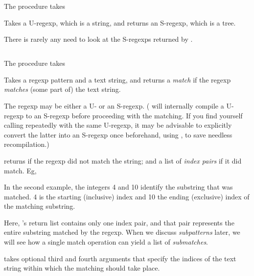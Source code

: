 {\ifx\MzLibManual\Undefined
The procedure  takes 
\else
{}

Takes 
\fi
a U-regexp, which is a string, and returns
an S-regexp, which is a tree.


\n There is rarely any need to look at the S-regexps 
returned by .

\subsection{}

\ifx\MzLibManual\Undefined
The procedure  takes 
\else
{}

Takes
\fi
a
regexp pattern and a text string, and returns a {\em
match} if the regexp {\em matches} (some part of) the text string.

The regexp may be either a U- or an S-regexp.
( will internally compile a
U-regexp to an S-regexp before proceeding with the
matching.  If you find yourself calling
 repeatedly with the same
U-regexp, it may be advisable to explicitly convert the
latter into an S-regexp once beforehand, using
, to save needless recompilation.)

 returns  if the regexp did not
match the string; and a list of {\em index pairs} if it
did match.  Eg,


\n In the second example, the integers 4 and 10 identify
the substring that was matched. 4 is the starting
(inclusive) index and 10 the ending (exclusive) index of
the matching substring.


Here, 's return list contains only 
one index pair, and that pair represents the entire
substring matched by the regexp.  When we discuss
{\em subpatterns} later, we will see how a single match
operation can yield a list of {\em submatches}.

 takes optional third
and fourth arguments that specify the indices of
the text string within which the matching should
take place.   

}
